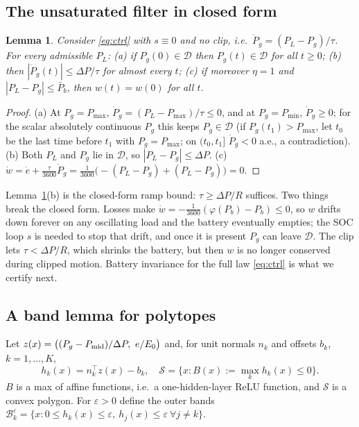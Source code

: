\documentclass[journal]{IEEEtran}
\newtheorem{lemma}{Lemma}
\theoremstyle{remark}
\newcommand{\Pmin}{P_{\min}}
\newcommand{\Pmax}{P_{\max}}
\newcommand{\Pbar}{\bar P_b}
\newcommand{\D}{\mathcal{D}}
\newcommand{\Sset}{\mathcal{S}}
\begin{document}
\subsection{The unsaturated filter in closed form}
\begin{lemma}\label{lem:lpf}
Consider \eqref{eq:ctrl} with $s\equiv 0$ and no clip, i.e.\ $\dot P_g=(P_L-P_g)/\tau$. For every admissible $P_L$:
(a) if $P_g(0)\in\D$ then $P_g(t)\in\D$ for all $t\ge0$;
(b) then $|\dot P_g(t)|\le\Delta P/\tau$ for almost every $t$;
(c) if moreover $\eta=1$ and $|P_L-P_g|\le\Pbar$, then $w(t)=w(0)$ for all $t$.
\end{lemma}
\begin{proof}
(a) At $P_g=\Pmax$, $\dot P_g=(P_L-\Pmax)/\tau\le 0$, and at $P_g=\Pmin$, $\dot P_g\ge0$; for the scalar
absolutely continuous $P_g$ this keeps $P_g\in\D$ (if $P_g(t_1)>\Pmax$, let $t_0$ be the last time before $t_1$ with
$P_g=\Pmax$; on $(t_0,t_1]$ $\dot P_g<0$ a.e., a contradiction). (b) Both $P_L$ and $P_g$ lie in $\D$, so
$|P_L-P_g|\le\Delta P$. (c) $\dot w=\dot e+\tfrac{\tau}{3600}\dot P_g=\tfrac{1}{3600}\big(-(P_L-P_g)+(P_L-P_g)\big)=0$.
\end{proof}

Lemma~\ref{lem:lpf}(b) is the closed-form ramp bound: $\tau\ge\Delta P/R$ suffices. Two things break the closed form.
Losses make $\dot w=-\tfrac{1}{3600}(\varphi(P_b)-P_b)\le0$, so $w$ drifts down forever on any oscillating load
and the battery eventually empties; the SOC loop $s$ is needed to stop that drift, and once it is present $P_g$ can
leave $\D$. The clip lets $\tau<\Delta P/R$, which shrinks the battery, but then $w$ is no longer conserved during
clipped motion. Battery invariance for the full law \eqref{eq:ctrl} is what we certify next.

\subsection{A band lemma for polytopes}
Let $z(x)=\big((P_g-P_{\rm mid})/\Delta P,\ e/E_0\big)$ and, for unit normals $n_k$ and offsets $b_k$,
$k=1,\dots,K$,
\begin{equation}\label{eq:set}
h_k(x)=n_k^\top z(x)-b_k,\quad \Sset=\{x:B(x):=\max_k h_k(x)\le 0\}.
\end{equation}
$B$ is a max of affine functions, i.e.\ a one-hidden-layer ReLU function, and $\Sset$ is a convex polygon. For
$\varepsilon>0$ define the outer bands
$\mathcal{B}_k^\varepsilon=\{x:0\le h_k(x)\le\varepsilon,\ h_j(x)\le\varepsilon\ \forall j\ne k\}$.
\end{document}
